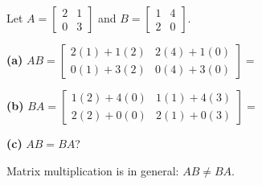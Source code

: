 \documentclass[10pt]{article}
\begin{document}
\begin{tcolorbox}[colback=white, colframe=black!40,
    title=\textbf{Tier A --- Apply: Does Order Matter?},
    fonttitle=\bfseries, arc=2mm, left=3mm, right=3mm, top=2mm, bottom=2mm]

Let $A = \begin{bmatrix}2 & 1 \\ 0 & 3\end{bmatrix}$ and $B = \begin{bmatrix}1 & 4 \\ 2 & 0\end{bmatrix}$.

\medskip
\textbf{(a)} $AB = \begin{bmatrix}2(1)+1(2) & 2(4)+1(0) \\ 0(1)+3(2) & 0(4)+3(0)\end{bmatrix}
= $ 

\medskip
\textbf{(b)} $BA = \begin{bmatrix}1(2)+4(0) & 1(1)+4(3) \\ 2(2)+0(0) & 2(1)+0(3)\end{bmatrix}
= $ 

\medskip
\textbf{(c)} $AB = BA$? 

Matrix multiplication is  in general: $AB \neq BA$.

\end{tcolorbox}

\vspace{0.1in}
\end{document}
